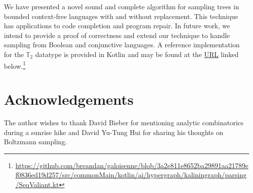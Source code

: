 \documentclass[sigplan,nonacm]{acmart}\settopmatter{printfolios=false,printccs=false,printacmref=false}
\begin{document}
  We have presented a novel sound and complete algorithm for sampling trees in bounded context-free languages with and without replacement. This technique has applications to code completion and program repair. In future work, we intend to provide a proof of correctness and extend our technique to handle sampling from Boolean and conjunctive languages. A reference implementation for the $\mathbb{T}_2$ datatype is provided in Kotlin and may be found at the \href{https://github.com/breandan/galoisenne/blob/adcb90ac775f17582c5f9fbc4da041b0cf4bf3dc/src/commonMain/kotlin/ai/hypergraph/kaliningraph/parsing/SeqValiant.kt}{URL} linked below.\footnote{\url{https://github.com/breandan/galoisenne/blob/3a2e811e8652ba29891aa21789ef0836ed19d257/src/commonMain/kotlin/ai/hypergraph/kaliningraph/parsing/SeqValiant.kt}}

  \section{Acknowledgements}

  The author wishes to thank David Bieber for mentioning analytic combinatorics during a sunrise hike and David Yu-Tung Hui for sharing his thoughts on Boltzmann sampling.

  
\end{document}
